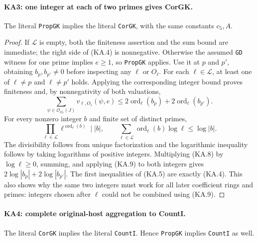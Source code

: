 \paragraph{KA3: one integer at each of two primes gives CorGK.}
\label{claim:KA3}
The literal \texttt{PropGK} implies the literal \texttt{CorGK},
with the same constants $c_5,A$.

\begin{proof}
If $\mathcal L$ is empty, both the finiteness assertion and the
sum bound are immediate; the right side of (KA.4) is nonnegative.
Otherwise the assumed \texttt{GD} witness for one prime implies
$e\ge1$, so \texttt{PropGK} applies.  Use it at $p$ and $p'$,
obtaining $b_p,b_{p'}\ne0$ before inspecting any $\ell$ or $O_\ell$.
For each $\ell\in\mathcal L$, at least one of $\ell\ne p$ and
$\ell\ne p'$ holds.  Applying the corresponding integer bound
proves finiteness and, by nonnegativity of both valuations,
\[
  \sum_{\psi\in\mathcal O_{O_\ell}(J)}v_{\ell,O_\ell}(\psi,e)
    \le2\operatorname{ord}_\ell(b_p)
                      +2\operatorname{ord}_\ell(b_{p'}).
 \tag{KA.8}
\]
For every nonzero integer $b$ and finite set of distinct primes,
\[
 \prod_{\ell\in\mathcal L}\ell^{\operatorname{ord}_\ell(b)}
       \mid |b|,
 \qquad
 \sum_{\ell\in\mathcal L}\operatorname{ord}_\ell(b)\log\ell
       \le\log|b|.
 \tag{KA.9}
\]
The divisibility follows from unique factorization and the
logarithmic inequality follows by taking logarithms of positive
integers.  Multiplying (KA.8) by $\log\ell\ge0$, summing, and
applying (KA.9) to both integers gives
$2\log|b_p|+2\log|b_{p'}|$.  The first inequalities of (KA.5)
are exactly (KA.4).  This also shows why the same two integers
must work for all later coefficient rings and primes: integers
chosen after $\ell$ could not be combined using (KA.9).
\end{proof}

\paragraph{KA4: complete original-host aggregation to CountI.}
\label{claim:KA4}
The literal \texttt{CorGK} implies the literal \texttt{CountI}.
Hence \texttt{PropGK} implies \texttt{CountI} as well.

